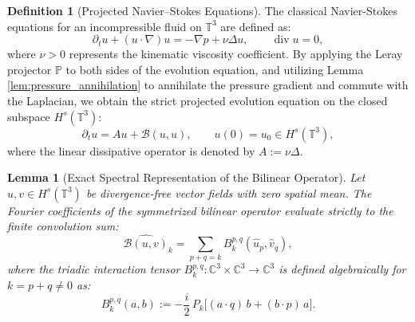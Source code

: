 \documentclass[12pt,a4paper]{article}
\theoremstyle{plain}
\newtheorem{lemma}[theorem]{Lemma}
\theoremstyle{definition}
\newtheorem{definition}[theorem]{Definition}
\theoremstyle{remark}
\newcommand{\Hs}{H^s}
\newcommand{\T}{\mathbb{T}}
\newcommand{\dive}{\operatorname{div}}
\newcommand{\grad}{\nabla}
\newcommand{\BB}{\mathcal{B}}
\newcommand{\PP}{\mathbb{P}}
\begin{document}
\begin{definition}[Projected Navier--Stokes Equations]
\label{def:NS}
The classical Navier-Stokes equations for an incompressible fluid on $\T^3$ are defined as:
\[
  \partial_t u + (u\cdot\grad)u = -\grad p + \nu\Delta u, \qquad \dive u = 0,
\]
where $\nu > 0$ represents the kinematic viscosity coefficient. By applying the Leray projector $\PP$ to both sides of the evolution equation, and utilizing Lemma \ref{lem:pressure_annihilation} to annihilate the pressure gradient and commute with the Laplacian, we obtain the strict projected evolution equation on the closed subspace $\Hs(\T^3)$:
\[
  \partial_t u = A u + \BB(u,u), \qquad u(0) = u_0 \in \Hs(\T^3),
  \tag{NS}
\]
where the linear dissipative operator is denoted by $A := \nu\Delta$.
\end{definition}

\begin{lemma}[Exact Spectral Representation of the Bilinear Operator]
\label{lem:BFourier}
Let $u, v \in \Hs(\T^3)$ be divergence-free vector fields with zero spatial mean. The Fourier coefficients of the symmetrized bilinear operator evaluate strictly to the finite convolution sum:
\[
  \widehat{\BB(u,v)}_k
  =
  \sum_{p+q=k} B_k^{p,q}(\hat{u}_p,\hat{v}_q),
\]
where the triadic interaction tensor $B_k^{p,q} : \mathbb{C}^3 \times \mathbb{C}^3 \to \mathbb{C}^3$ is defined algebraically for $k = p+q \neq 0$ as:
\[
  B_k^{p,q}(a,b)
  :=
  -\frac{i}{2}\,P_k\!\Big[(a\cdot q)\,b + (b\cdot p)\,a\Big].
  \tag{B}
\]
\end{lemma}
\end{document}
